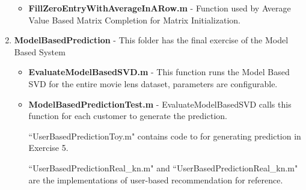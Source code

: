 \begin{enumerate}
\begin{itemize}
\item \textbf{FillZeroEntryWithAverageInARow.m} - Function used by Average Value Based Matrix Completion for Matrix Initialization.
\end{itemize}
\item \textbf{ModelBasedPrediction} - This folder has the final exercise of the Model Based System
\begin{itemize}
\item \textbf{EvaluateModelBasedSVD.m} - This function runs the Model Based SVD for the entire movie lens dataset, parameters are configurable.
\item \textbf{ModelBasedPredictionTest.m} - EvaluateModelBasedSVD calls this function for each customer to generate the prediction.


``UserBasedPredictionToy.m" contains code to for generating prediction in Exercise 5.

``UserBasedPredictionReal\_kn.m" and ``UserBasedPredictionReal\_kn.m" are the implementations of user-based recommendation for reference.
\end{itemize}
\end{enumerate}

